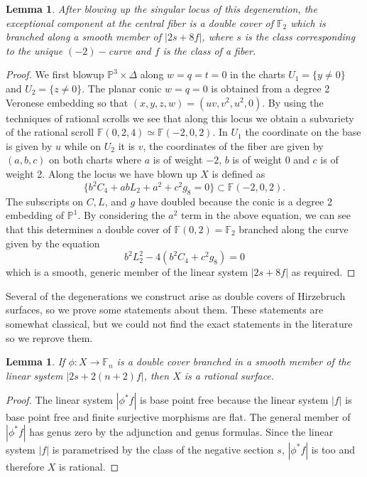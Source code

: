 \documentclass[a4paper]{amsart}
\theoremstyle{definition}
\theoremstyle{plain}
\newtheorem{lemma}[defn]{Lemma}
\theoremstyle{remark}
\newcommand{\PS}{\mathbb{P}}
\newcommand{\F}{\mathbb{F}}
\begin{document}
\begin{lemma}\label{lem: blowup non-normal conic}
After blowing up the singular locus of this degeneration, the exceptional component at the central fiber is a double cover of $\mathbb{F}_2$ which is branched along a smooth member of $|2s+8f|$, where $s$ is the class corresponding to the unique $(-2)-$curve and $f$ is the class of a fiber.
\end{lemma}
\begin{proof}
We first blowup $\PS^3 \times \Delta$ along $w=q=t=0$ in the charts $U_1 =\{y\neq0\}$ and $U_2=\{z\neq0\}$. The planar conic $w=q=0$ is obtained from a degree 2 Veronese embedding so that $(x,y,z,w)=(uv,v^2,u^2,0)$. By using the techniques of rational scrolls we see that along this locus we obtain a subvariety of the rational scroll $\F(0,2,4)\simeq \F(-2,0,2)$. In $U_1$ the coordinate on the base is given by $u$ while on $U_2$ it is $v$, the coordinates of the fiber are given by $(a,b,c)$ on both charts where $a$ is of weight $-2$, $b$ is of weight 0 and $c$ is of weight 2. Along the locus we have blown up $X$ is defined as
$$\{b^2C_4+abL_2+a^2 +c^2g_8=0\} \subset \F(-2,0,2).$$
The subscripts on $C, L$, and $g$ have doubled because the conic is a degree 2 embedding of $\PS^1$. By considering the $a^2$ term in the above equation, we can see that this determines a double cover of $\F(0,2) = \F_2$ branched along the curve given by the equation
$$b^2L_2^2-4(b^2C_4+c^2g_8)=0$$
which is a smooth, generic member of the linear system $|2s+8f|$ as required.
\end{proof}

Several of the degenerations we construct arise as double covers of Hirzebruch surfaces, so we prove some statements about them. These statements are somewhat classical, but we could not find the exact statements in the literature so we reprove them.

\begin{lemma}\label{double cover hirzebruch rational}
If $\phi\colon X \rightarrow \mathbb{F}_n$ is a double cover branched in a smooth member of the linear system $|2s+2(n+2)f|$, then $X$ is a rational surface.
\end{lemma}

\begin{proof}
The linear system $|\phi^*f|$ is base point free because the linear system $|f|$ is base point free and finite surjective morphisms are flat. The general member of $|\phi^*f|$  has genus zero by the adjunction and genus formulas. Since the linear system $|f|$ is parametrised by the class of the negative section $s$, $|\phi^*f|$ is too and therefore $X$ is rational.
\end{proof}
\end{document}
